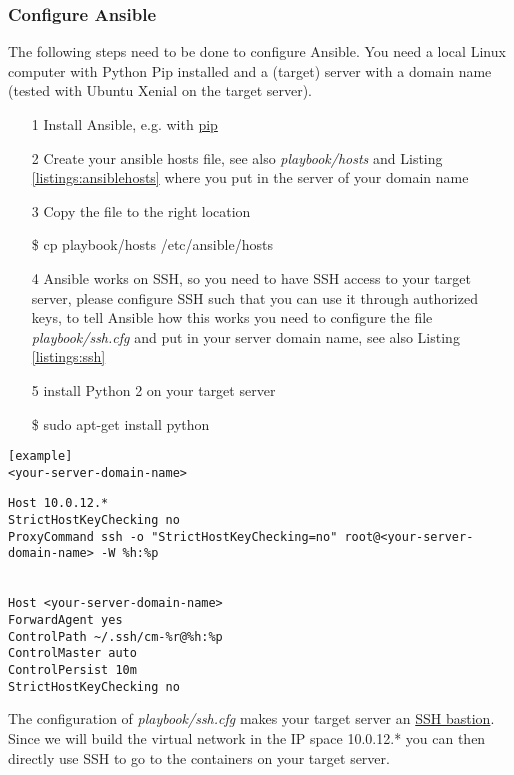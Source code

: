 \subsubsection{Configure Ansible}
The following steps need to be done to configure Ansible. You need a local Linux computer with Python Pip installed and a (target) server with a domain name (tested with Ubuntu Xenial on the target server). 
\begin{itemize}
	\item[1] Install Ansible, e.g. with \href{http://docs.ansible.com/ansible/intro_installation.html#latest-releases-via-pip}{pip}
	\item[2] Create your ansible hosts file, see also \textit{playbook/hosts} and Listing \ref{listings:ansiblehosts} where you put in the server of your domain name
	\item[3] Copy the file to the right location
	\begin{tcolorbox}
		\$	cp playbook/hosts /etc/ansible/hosts
	\end{tcolorbox}
	\item[4] Ansible works on SSH, so you need to have SSH access to your target server, please configure SSH such that you can use it through authorized keys, to tell Ansible how this works you need to configure the file \textit{playbook/ssh.cfg} and put in your server domain name, see also Listing \ref{listings:ssh}
	\item[5] install Python 2 on your target server
		\begin{tcolorbox}
		\$	sudo apt-get install python
	\end{tcolorbox}
\end{itemize}
\begin{lstlisting}[caption={Example of Ansible hosts file},label={listings:ansiblehosts}]
[example]
<your-server-domain-name>
\end{lstlisting}
\begin{lstlisting}[caption={Example of Ansible ssh.cfg file},label={listings:ssh}]
Host 10.0.12.*
StrictHostKeyChecking no
ProxyCommand ssh -o "StrictHostKeyChecking=no" root@<your-server-domain-name> -W %h:%p


Host <your-server-domain-name>
ForwardAgent yes
ControlPath ~/.ssh/cm-%r@%h:%p
ControlMaster auto
ControlPersist 10m
StrictHostKeyChecking no

\end{lstlisting}
The configuration of \textit{playbook/ssh.cfg} makes your target server an \href{http://blog.scottlowe.org/2015/11/21/using-ssh-bastion-host/}{SSH bastion}. Since we will build the virtual network in the IP space 10.0.12.* you can then directly use SSH to go to the containers on your target server. 


